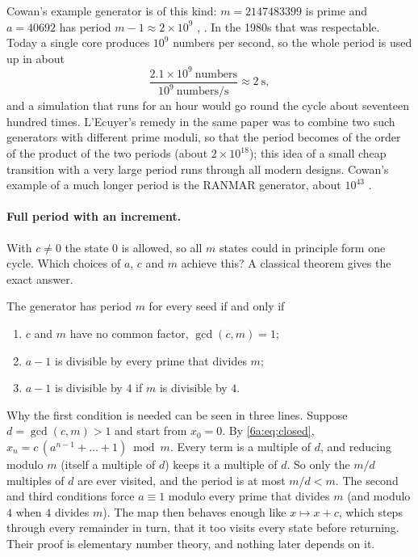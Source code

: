 Cowan's example generator is of this kind: $m=2147483399$ is prime and
$a=40692$ has period $m-1\approx2\times10^9$ ,
\cite{LEcuyer1988}. In the 1980s that was respectable. Today a single core produces
$10^9$ numbers per second, so the whole period is used up in about
\begin{equation*}
  \frac{2.1\times10^{9}\ \text{numbers}}{10^{9}\ \text{numbers/s}}\approx 2\ \text{s},
\end{equation*}
and a simulation that runs for an hour would go round the cycle about
seventeen hundred times. L'Ecuyer's remedy in the same paper was to combine two such
generators with different prime moduli, so that the period becomes of the order of
the product of the two periods (about $2\times10^{18}$); this idea of a small cheap transition with a very large period runs
through all modern designs. Cowan's example of a much longer period is the RANMAR
generator, about $10^{43}$ .

\paragraph{Full period with an increment.}
With $c\neq0$ the state $0$ is allowed, so all $m$ states could in principle
form one cycle. Which choices of $a$, $c$ and $m$ achieve this? A classical theorem
gives the exact answer.

\begin{keyidea}
The generator has period $m$ for every seed if and only if
\begin{enumerate}[itemsep=0pt]
  \item $c$ and $m$ have no common factor, $\gcd(c,m)=1$;
  \item $a-1$ is divisible by every prime that divides $m$;
  \item $a-1$ is divisible by $4$ if $m$ is divisible by $4$.
\end{enumerate}
\end{keyidea}

Why the first condition is needed can be seen in three lines. Suppose
$d=\gcd(c,m)>1$ and start from $x_0=0$. By \eqref{6a:eq:closed}, $x_n=c\,(a^{n-1}+\dots+1)\bmod m$. Every term
is a multiple of $d$, and reducing modulo $m$ (itself a multiple of $d$) keeps it
a multiple of $d$. So only the $m/d$ multiples of $d$ are ever visited, and the
period is at most $m/d<m$. The second and third conditions force $a\equiv1$ modulo every prime that
divides $m$ (and modulo $4$ when $4$ divides $m$). The map then behaves enough
like $x\mapsto x+c$, which steps through every remainder in turn, that it too
visits every state before returning. Their proof is elementary number theory, and
nothing later depends on it.

